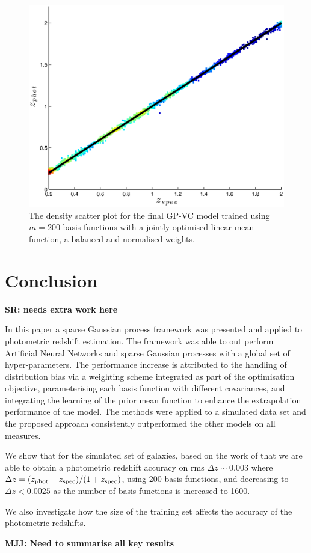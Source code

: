 \documentclass[useAMS,usenatbib,fleqn]{mn2e}
\begin{document}
\begin{figure}
       \centering
        \includegraphics[width=\columnwidth]{figures/final-model.eps}
        \caption{The density scatter plot for the final GP-VC model trained using $m=200$ basis functions with a jointly optimised linear mean function, a balanced and normalised weights. }
       \label{fig-final-model}
\end{figure}

\section{Conclusion}
\label{sec-conclusion}
\textbf{SR: needs extra work here}

In this paper a sparse Gaussian process framework was presented and applied to photometric redshift estimation. The framework was able to out perform Artificial Neural Networks and sparse Gaussian processes with a global set of hyper-parameters. The performance increase is attributed to the handling of distribution bias via a weighting scheme integrated as part of the optimisation objective, parameterising each basis function with different covariances, and integrating the learning of the prior mean function to enhance the extrapolation performance of the model. The methods were applied to a simulated data set and the proposed approach consistently outperformed the other models on all measures.

We show that for the simulated set of galaxies, based on the work of \cite{jouvel09} that we are able to obtain a photometric redshift accuracy on rms $\Delta z  \sim 0.003$ where $\Delta z = (z_{\rm phot} - z_{\rm spec})/(1+z_{\rm spec})$, using 200 basis functions, and decreasing to $\Delta z < 0.0025$ as the number of basis functions is increased to 1600.

We also investigate how the size of the training set affects the accuracy of the photometric redshifts.

{\bf MJJ: Need to summarise all key results}
\footnotesize{


}

\label{lastpage}
\end{document}
